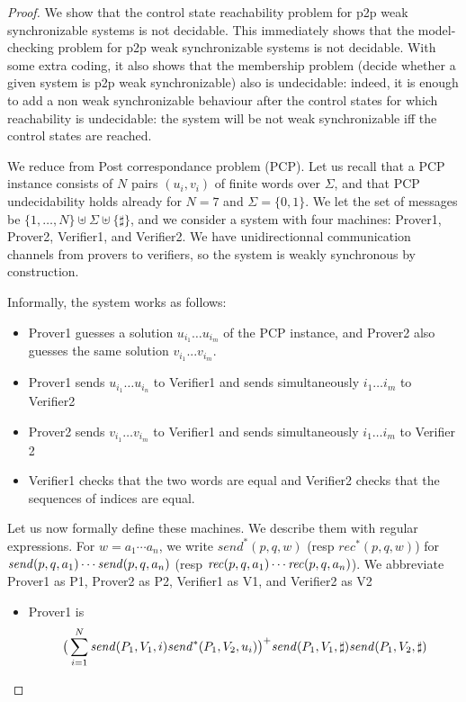 \documentclass[a4paper,UKenglish,cleveref, autoref, thm-restate]{lipics-v2021}
\begin{document}
\begin{proof}
We show that the control state reachability problem for p2p weak
synchronizable systems is not decidable. This immediately shows
that the model-checking problem for p2p weak synchronizable systems
is not decidable. With some extra coding, it also shows that the
membership problem (decide whether a given system is p2p weak synchronizable)
also is undecidable: indeed, it is enough to add a non weak
synchronizable behaviour after the control states for which reachability is
undecidable: the system will be not weak synchronizable iff the control
states are reached.

We reduce from Post correspondance problem (PCP).
Let us recall that a PCP instance consists of $N$ pairs $(u_i,v_i)$ of
finite words over $\Sigma$, and that PCP undecidability holds already for
$N=7$ and $\Sigma=\{0,1\}$. We let the set of messages be
$\{1,\dots,N\}\uplus\Sigma\uplus\{\sharp\}$, and we consider a system with
four machines: Prover1, Prover2, Verifier1, and Verifier2. We have
unidirectionnal communication channels from provers to verifiers,
so the system is weakly synchronous by construction.

Informally, the system works as follows:
\begin{itemize}
\item Prover1 guesses a solution $u_{i_1}\dots u_{i_m}$ of the PCP instance,
and Prover2 also guesses the same solution $v_{i_1}...v_{i_m}$.
\item Prover1 sends $u_{i_1}\dots u_{i_n}$ to Verifier1 and sends
simultaneously $i_1\dots i_m$ to Verifier2
\item Prover2 sends $v_{i_1}\dots v_{i_m}$ to Verifier1 and sends
simultaneously $i_1\dots i_m$ to Verifier 2
\item Verifier1 checks that the two words are equal and Verifier2 checks that the sequences of indices are equal.
\end{itemize}

Let us now formally define these machines.
We describe them with regular expressions. For $w=a_1\cdots a_n$,
we write $\mathit{send}^*(p,q,w)$ (resp $\mathit{rec}^*(p,q,w)$)
for $\mathit{send}(p, q, a_1)\cdots \mathit{send}(p, q, a_n)$ (resp $\mathit{rec}(p, q, a_1)\cdots\mathit{rec}(p, q, a_n)$). We abbreviate Prover1 as P1, Prover2 as P2, Verifier1 as V1, and Verifier2 as V2

\begin{itemize}
\item Prover1 is $$\big(\sum_{i=1}^N\mathit{send}(P_1, V_1, i)\mathit{send}^*(P_1,V_2,u_i)\big)^+\mathit{send}(P_1, V_1, \sharp)\mathit{send}(P_1, V_2, \sharp)$$


\end{itemize}
\end{proof}
\end{document}
